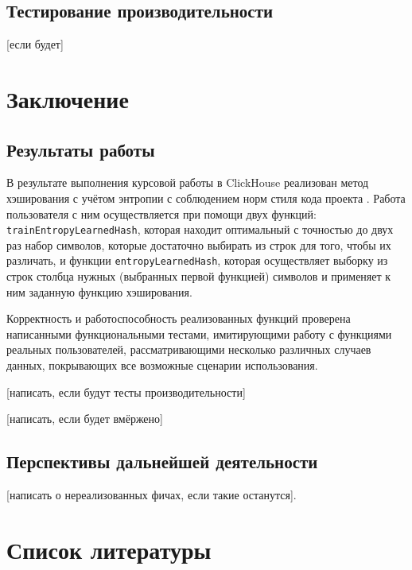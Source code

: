 \documentclass[a4paper,12pt]{extarticle}
\begin{document}
\begin{sloppypar}
\subsection{Тестирование производительности}
[если будет]

\newpage

\section{Заключение}
\subsection{Результаты работы}
В результате выполнения курсовой работы в ClickHouse реализован метод хэширования с учётом энтропии с соблюдением норм стиля кода проекта \cite{clickhouse_code_style_guide}. Работа пользователя с ним осуществляется при помощи двух функций: \texttt{trainEntropyLearnedHash}, которая находит оптимальный с точностью до двух раз набор символов, которые достаточно выбирать из строк для того, чтобы их различать, и функции \texttt{entropyLearnedHash}, которая осуществляет выборку из строк столбца нужных (выбранных первой функцией) символов и применяет к ним заданную функцию хэширования.

Корректность и работоспособность реализованных функций проверена написанными функциональными тестами, имитирующими работу с функциями реальных пользователей, рассматривающими несколько различных случаев данных, покрывающих все возможные сценарии использования.

[написать, если будут тесты производительности]

[написать, если будет вмёржено]

\subsection{Перспективы дальнейшей деятельности}

[написать о нереализованных фичах, если такие останутся].

\newpage

\section{Список литературы}
\printbibliography[heading=none]
\newpage

\end{sloppypar}

\end{document}
